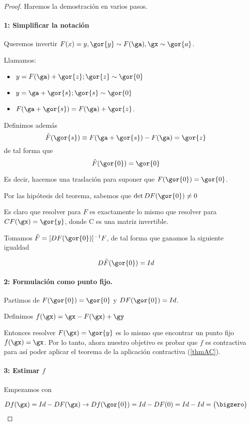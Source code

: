 \begin{proof} Haremos la demostración en varios pasos.

 \paragraph{1: Simplificar la notación}  Queremos invertir $F(x) = y, \gor{y} \sim F(\ga), \gx \sim \gor{a}$.

 Llamamos:
 \begin{itemize}
  \item $y = F(\ga) + \gor{z}; \gor{z} \sim \gor{0}$
  \item $y = \ga + \gor{s}; \gor{s} \sim \gor{0}$
\item  $F(\ga+\gor{s}) = F(\ga)+\gor{z}$.
  \end{itemize}
 Definimos además \[ \tilde{F}(\gor{s}) \equiv F(\ga + \gor{s}) - F(\ga) = \gor{z} \] de tal forma que  \[ \tilde{F}(\gor{0}) = \gor{0} \]

 Es decir, hacemos una traslación para suponer que $F(\gor{0}) = \gor{0}$.

 Por las hipótesis del teorema, sabemos que $\det DF(\gor{0}) \neq 0$

 Es claro que resolver para $F$ es exactamente lo mismo que resolver para $CF(\gx) = \gor{y}$, donde C es una matriz invertible.

 Tomamos $\tilde{F} = [DF(\gor{0})]^{-1}F$, de tal forma que ganamos la siguiente igualdad

 \[ D\tilde{F}(\gor{0}) = Id \]

 \paragraph{2: Formulación como punto fijo.}

 Partimos de $F(\gor{0})=\gor{0}$ y $ DF(\gor{0}) = Id$.

 Definimos $f(\gx) = \gx - F(\gx)+\gy$

 Entonces resolver $F(\gx) = \gor{y}$ es lo mismo que encontrar un punto fijo $f(\gx) = \gx$. Por lo tanto, ahora nuestro objetivo es probar que $f$ es contractiva para así poder aplicar el teorema de la aplicación contractiva (\ref{thmAC}).

 \paragraph{3: Estimar $f$} Empezamos con

 \[ Df(\gx) = Id - DF(\gx) \rightarrow Df(\gor{0}) = Id - DF(0) = Id - Id = \begin{pmatrix}  \bigzero \end{pmatrix}  \]


\end{proof}
